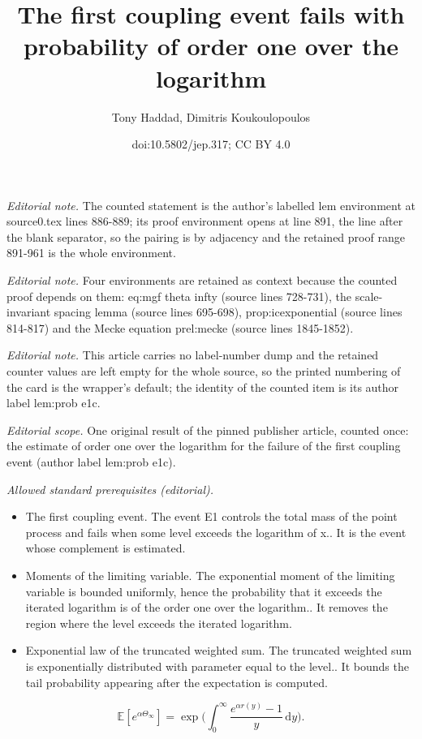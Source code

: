 \documentclass[10pt,a4paper]{article}
\title{The first coupling event fails with probability of order one over the logarithm}
\author{Tony Haddad, Dimitris Koukoulopoulos}
\date{doi:10.5802/jep.317; CC BY 4.0}
\newcommand{\EE}{\mathbb{E}}
\newcommand{\bggg}{\bigg}
\theoremstyle{plain}
\theoremstyle{definition}
\begin{document}
\maketitle
\noindent\textit{Editorial note.} The counted statement is the author's labelled lem environment at source0.tex lines 886-889; its proof environment opens at line 891, the line after the blank separator, so the pairing is by adjacency and the retained proof range 891-961 is the whole environment.\par\medskip
\noindent\textit{Editorial note.} Four environments are retained as context because the counted proof depends on them: eq:mgf theta infty (source lines 728-731), the scale-invariant spacing lemma (source lines 695-698), prop:icexponential (source lines 814-817) and the Mecke equation prel:mecke (source lines 1845-1852).\par\medskip
\noindent\textit{Editorial note.} This article carries no label-number dump and the retained counter values are left empty for the whole source, so the printed numbering of the card is the wrapper's default; the identity of the counted item is its author label lem:prob e1c.\par\medskip
\noindent\textit{Editorial scope.} One original result of the pinned publisher article, counted once: the estimate of order one over the logarithm for the failure of the first coupling event (author label lem:prob e1c).\par\medskip
\noindent\textit{Allowed standard prerequisites (editorial).}\begin{itemize}
\item The first coupling event. The event E1 controls the total mass of the point process and fails when some level exceeds the logarithm of x.. It is the event whose complement is estimated.
\item Moments of the limiting variable. The exponential moment of the limiting variable is bounded uniformly, hence the probability that it exceeds the iterated logarithm is of the order one over the logarithm.. It removes the region where the level exceeds the iterated logarithm.
\item Exponential law of the truncated weighted sum. The truncated weighted sum is exponentially distributed with parameter equal to the level.. It bounds the tail probability appearing after the expectation is computed.
\end{itemize}\medskip
\begin{equation}
\label{eq:mgf theta infty}
\EE[e^{\alpha \Theta_\infty}] = \exp\!\bggg(\!\int_{0}^\infty \frac{e^{\alpha r(y)} - 1}{y}\, \mathrm dy\bggg).
\end{equation}
\end{document}
